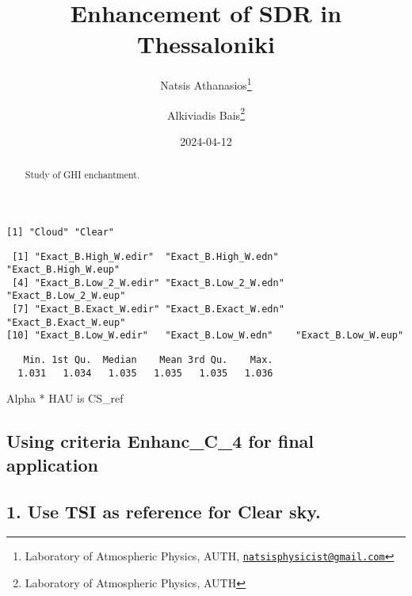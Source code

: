 \documentclass[
  10pt,
  a4paper,oneside]{article}
\title{Enhancement of SDR in Thessaloniki}
\author{Natsis Athanasios\footnote{Laboratory of Atmospheric Physics, AUTH, \href{mailto:natsisphysicist@gmail.com}{\nolinkurl{natsisphysicist@gmail.com}}} \and Alkiviadis Bais\footnote{Laboratory of Atmospheric Physics, AUTH}}
\date{2024-04-12}
\begin{document}
\maketitle
\begin{abstract}
Study of GHI enchantment.
\end{abstract}

{
\hypersetup{linkcolor=}
\setcounter{tocdepth}{4}
\tableofcontents
}
\begin{verbatim}
[1] "Cloud" "Clear"
\end{verbatim}

\begin{verbatim}
 [1] "Exact_B.High_W.edir"  "Exact_B.High_W.edn"   "Exact_B.High_W.eup"  
 [4] "Exact_B.Low_2_W.edir" "Exact_B.Low_2_W.edn"  "Exact_B.Low_2_W.eup" 
 [7] "Exact_B.Exact_W.edir" "Exact_B.Exact_W.edn"  "Exact_B.Exact_W.eup" 
[10] "Exact_B.Low_W.edir"   "Exact_B.Low_W.edn"    "Exact_B.Low_W.eup"   
\end{verbatim}

\begin{verbatim}
   Min. 1st Qu.  Median    Mean 3rd Qu.    Max. 
  1.031   1.034   1.035   1.035   1.035   1.036 
\end{verbatim}

Alpha * HAU is CS\_ref

\hypertarget{using-criteria-enhanc_c_4-for-final-application}{%
\subsection{\texorpdfstring{Using criteria \textbf{Enhanc\_C\_4} for final application}{Using criteria Enhanc\_C\_4 for final application}}\label{using-criteria-enhanc_c_4-for-final-application}}

\hypertarget{use-tsi-as-reference-for-clear-sky.}{%
\subsection{1. Use TSI as reference for Clear sky.}\label{use-tsi-as-reference-for-clear-sky.}}
\end{document}
